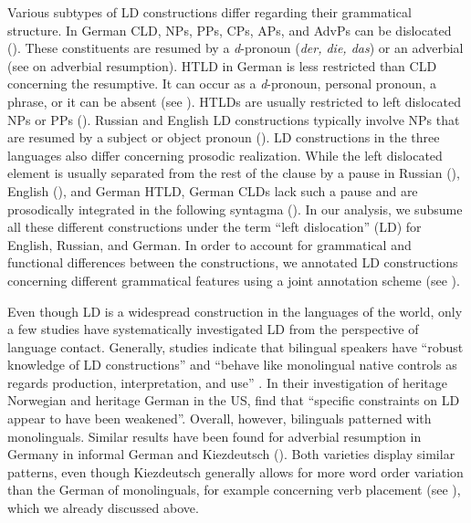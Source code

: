 \documentclass[output=paper,colorlinks,citecolor=brown]{langscibook}
\begin{document}
Various subtypes of LD constructions differ regarding their grammatical structure. In German CLD, NPs, PPs, CPs, APs, and AdvPs can be dislocated (\cite{dewald_versetzungsstrukturen_2012}). These constituents are resumed by a \textit{d}-pronoun (\textit{der, die, das}) or an adverbial (see \cite{sluckin_noncanonical_2023} on adverbial resumption). HTLD in German is less restricted than CLD concerning the resumptive. It can occur as a \textit{d}-pronoun, personal pronoun, a phrase, or it can be absent (see \cite{altmann_formen_1981, dewald_versetzungsstrukturen_2012}). HTLDs are usually restricted to left dislocated NPs or PPs (\cite{selting_voranstellungen_1993}). Russian and English LD constructions typically involve NPs that are resumed by a subject or object pronoun (\cite{king_configuring_1995, kallestinova_aspects_2007}). LD constructions in the three languages also differ concerning prosodic realization. While the left dislocated element is usually separated from the rest of the clause by a pause in Russian (\cite{bailyn_syntax_2012}), English (\cite{frey_pragmatic_2005}), and German HTLD, German CLDs lack such a pause and are prosodically integrated in the following syntagma (\cite{altmann_formen_1981, selting_voranstellungen_1993, dewald_versetzungsstrukturen_2012}). In our analysis, we subsume all these different constructions under the term “left dislocation” (LD) for English, Russian, and German. In order to account for grammatical and functional differences between the constructions, we annotated LD constructions concerning different grammatical features using a joint annotation scheme (see ).

Even though LD is a widespread construction in the languages of the world, only a few studies have systematically investigated LD from the perspective of language contact. Generally, studies indicate that bilingual speakers have “robust knowledge of LD constructions” and “behave like monolingual native controls as regards production, interpretation, and use” \citep[11]{bousquette_competition_2021}. In their investigation of heritage Norwegian and heritage German in the US, \citet[17]{bousquette_competition_2021} find that “specific constraints on LD appear to have been weakened”. Overall, however, bilinguals patterned with monolinguals. Similar results have been found for adverbial resumption in Germany in informal German and 
Kiezdeutsch (\cite{sluckin_noncanonical_2023}). Both varieties display similar patterns, even though Kiezdeutsch generally allows for more word order variation than the German of monolinguals, for example concerning verb placement (see \cite{WieseHeike2016Cinu}), which we already discussed above.
\end{document}
